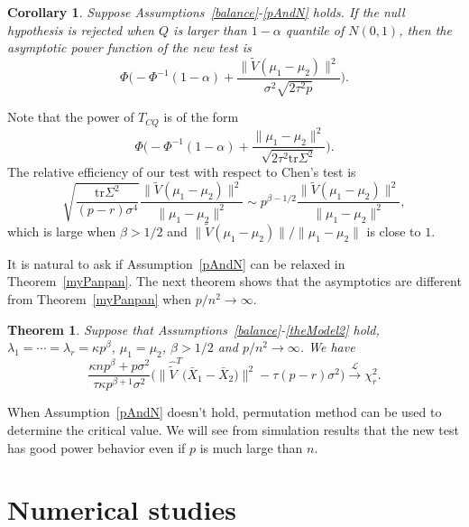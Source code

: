 \documentclass[review]{elsarticle}
\theoremstyle{plain}
\newtheorem{theorem}{\quad\quad Theorem}
\newtheorem{corollary}{\quad\quad Corollary}
\theoremstyle{definition}
\theoremstyle{remark}
\begin{document}
\begin{corollary}\label{testPowerh}
Suppose Assumptions~\ref{balance}-\ref{pAndN} holds.
    If the null hypothesis is rejected when $Q$ is larger than $1-\alpha$ quantile of $N(0,1)$, then the asymptotic power function of the new test is
    \begin{equation*}
        \Phi\Big(-\Phi^{-1}(1-\alpha)+\frac{\|\tilde{V}(\mu_1-\mu_2)\|^2}{\sigma^2\sqrt{2\tau^2p}}\Big).
    \end{equation*}
\end{corollary}


 Note that the power of $T_{CQ}$ is of the form
\begin{equation*}
    \Phi\Big(-\Phi^{-1}(1-\alpha)+\frac{\|\mu_1-\mu_2\|^2}{\sqrt{2\tau^2\mathrm{tr}\Sigma^2}}\Big).
\end{equation*}
 The relative efficiency of our test with respect to Chen's test is
\begin{equation*}
    \sqrt{\frac{\mathrm{tr}\Sigma^2}{(p-r)\sigma^4}}\frac{\|\tilde{V}(\mu_1-\mu_2)\|^2}{\|\mu_1-\mu_2\|^2}\sim p^{\beta-1/2}\frac{\|\tilde{V}(\mu_1-\mu_2)\|^2}{\|\mu_1-\mu_2\|^2},
\end{equation*}
which is large when $\beta>1/2$ and $\|\tilde{V}(\mu_1-\mu_2)\|/\|\mu_1-\mu_2\|$ is close to $1$.


It is natural to ask if Assumption~\ref{pAndN} can be relaxed in Theorem~\ref{myPanpan}.
The next theorem  shows that the asymptotics are different from Theorem~\ref{myPanpan} when $p/n^2\to \infty$.
\begin{theorem}\label{chilimthm}
    Suppose that Assumptions~\ref{balance}-\ref{theModel2} hold, $\lambda_1=\cdots=\lambda_r=\kappa p^{\beta}$,
    $\mu_1=\mu_2$, $\beta>1/2$ and $p/n^2\to \infty$. We have 
\begin{equation*}
\frac{\kappa n p^{\beta}+p\sigma^2}{\tau\kappa p^{\beta+1}\sigma^2}
        \big(
    \big\|\hat{\tilde{V}}^T\big(\bar{X}_1-\bar{X}_2\big)\big\|^2
        -\tau(p-r)\sigma^2\big)\xrightarrow{\mathcal{L}}\chi^2_r.
\end{equation*}
\end{theorem}
When Assumption~\ref{pAndN} doesn't hold,  permutation method can be used to determine the critical value.
We will see from simulation results that the new test has good power behavior even if $p$ is much large than $n$.



\section{Numerical studies}
\end{document}
